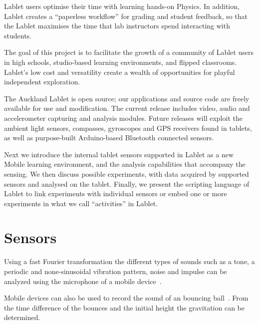 \documentclass{sigchi}
\begin{document}
Lablet users optimise their time with learning hands-on Physics.  In
addition, Lablet creates a “paperless workflow” for grading and
student feedback, so that the Lablet maximises the time that lab
instructors spend interacting with students.

The goal of this project is to facilitate the growth of a community of
Lablet users in high schools, studio-based learning
environments, and flipped classrooms.  Lablet’s low cost and
versatility create a wealth of opportunities for playful independent
exploration.  

The Auckland Lablet is open source; our applications and source code
are freely available for use and modification.  The current release
includes video, audio and accelerometer capturing and analysis
modules.  Future releases will exploit the ambient light sensors,
compasses, gyroscopes and GPS receivers found in tablets, as well as
purpose-built Arduino-based Bluetooth connected sensors.

Next we introduce the internal tablet sensors supported in Lablet as a
new Mobile learning environment, and the analysis capabilities that
accompany the sensing. We then discuss possible experiments, with data
acquired by supported sensors and analysed on the tablet. Finally, we
present the scripting language of Lablet to link experiments with
individual sensors or embed one or more experiments in what we call
``activities'' in Lablet.

\section{Sensors}





Using a fast Fourier transformation the different types of sounds such as a tone, a periodic and none-sinusoidal vibration pattern, noise and impulse can be analyzed using the microphone of a mobile device~\cite{KuhnAcousticPhenomena2013}.

Mobile devices can also be used to record the sound of an bouncing ball~\cite{Schwarz2013Acoustic}.
From the time difference of the bounces and the initial height the gravitation can be determined.
\end{document}
